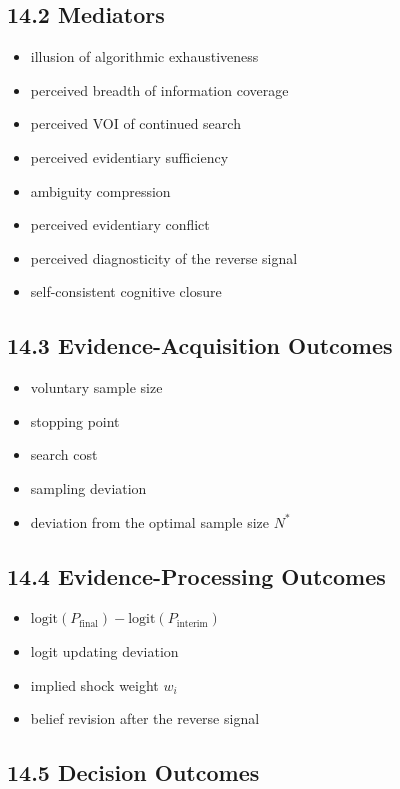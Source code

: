 \subsection*{14.2 Mediators}

\begin{itemize}[leftmargin=1.5em]
\item illusion of algorithmic exhaustiveness
\item perceived breadth of information coverage
\item perceived VOI of continued search
\item perceived evidentiary sufficiency
\item ambiguity compression
\item perceived evidentiary conflict
\item perceived diagnosticity of the reverse signal
\item self-consistent cognitive closure
\end{itemize}

\subsection*{14.3 Evidence-Acquisition Outcomes}

\begin{itemize}[leftmargin=1.5em]
\item voluntary sample size
\item stopping point
\item search cost
\item sampling deviation
\item deviation from the optimal sample size \(N^{*}\)
\end{itemize}

\subsection*{14.4 Evidence-Processing Outcomes}

\begin{itemize}[leftmargin=1.5em]
\item \(\text{logit}(P_{\text{final}}) - \text{logit}(P_{\text{interim}})\)
\item logit updating deviation
\item implied shock weight \(w_i\)
\item belief revision after the reverse signal
\end{itemize}

\subsection*{14.5 Decision Outcomes}

